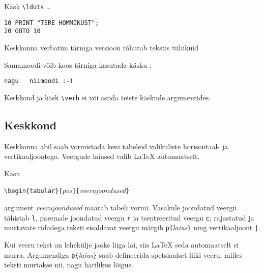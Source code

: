 \begin{example}
Käsk \verb|\ldots| \ldots

\begin{verbatim}
10 PRINT "TERE HOMMIKUST";
20 GOTO 10
\end{verbatim}
\end{example}

\begin{example}
\begin{verbatim*}
Keskkonna      verbatim
tärniga versioon
rõhutab    tekstis  tühikuid
\end{verbatim*}
\end{example}

Samamoodi võib koos tärniga kasutada käsku
:

\begin{example}
\verb*|nagu   niimoodi :-) |
\end{example}

Keskkond  ja käsk \verb|\verb| ei või asuda teiste
käskude argumentides.

\subsection{Keskkond }

\newcommand{\mfr}[1]{\texttt{#1}}

Keskkonna  abil saab vormistada keni tabeleid
valikuliste horisontaal- ja vertikaaljoontega. Veergude laiused valib
\LaTeX{} automaatselt.

Käsu
\begin{lscommand}
\verb|\begin{tabular}[|\emph{pos}\verb|]{|\emph{veerujoondused}\verb|}|
\end{lscommand}
\noindent argument \emph{veerujoondused} määrab tabeli vormi. Vasakule
joondatud veergu tähistab \mfr{l}, paremale joondatud veergu \mfr{r} ja
tsentreeritud veergu \mfr{c}; rajastatud ja murtavate ridadega teksti
sisaldavat veergu märgib \mfr{p\{}\emph{laius}\mfr{\}} ning
vertikaaljoont \mfr{|}.

Kui veeru tekst on lehekülje jaoks liiga lai, siis \LaTeX{} seda
automaatselt ei murra. Argumendiga \mfr{p\{}\emph{laius}\mfr{\}} saab
defineerida spetsiaalset liiki veeru, milles teksti murtakse nii, nagu
harilikus lõigus.


